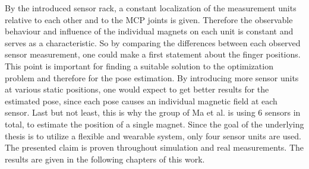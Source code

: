By the introduced sensor rack, a constant localization of the measurement units relative to each other and to the \ac{MCP} joints is given. Therefore the observable behaviour and influence of the individual magnets on each unit is constant and serves as a characteristic. So by comparing the differences between each observed sensor measurement, one could make a first statement about the finger positions. This point is important for finding a suitable solution to the optimization problem and therefore for the pose estimation. By introducing more sensor units at various static positions, one would expect to get better results for the estimated pose, since each pose causes an individual magnetic field at each sensor. Last but not least, this is why the group of Ma et al. is using 6 sensors in total, to estimate the position of a single magnet. Since the goal of the underlying thesis is to utilize a flexible and wearable system, only four sensor units are used. The presented claim is proven throughout simulation and real measurements. The results are given in the following chapters of this work.

\FloatBarrier




